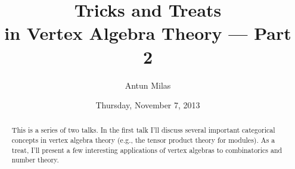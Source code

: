 \documentclass{UAmathtalk}
\author{Antun Milas}
\title{Tricks and Treats\\ in Vertex Algebra Theory --- Part 2}
\date{Thursday, November 7, 2013}
\begin{document}
\maketitle

\begin{abstract}
This is a series of two talks.
In the first talk I'll discuss several important categorical concepts in vertex algebra theory (e.g., the tensor product theory for modules).
As a treat, I'll present a few interesting applications of vertex algebras to combinatorics and number theory. 
\end{abstract}
\end{document}
